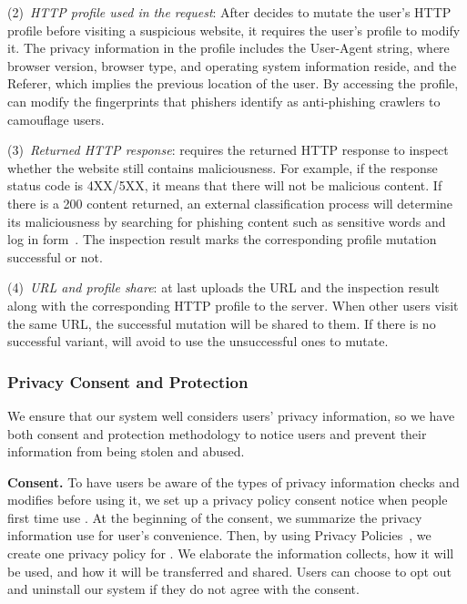 (2)~\emph{HTTP profile used in the request}:
After \spartacus decides to mutate the user's HTTP profile before visiting a suspicious website, it requires the user's profile to modify it.
The privacy information in the profile includes the User-Agent string, where browser version, browser type, and operating system information reside, and the Referer, which implies the previous location of the user.
By accessing the profile, \spartacus can modify the fingerprints that phishers identify as anti-phishing crawlers to camouflage users.

(3)~\emph{Returned HTTP response}:
\spartacus requires the returned HTTP response to inspect whether the website still contains maliciousness.
For example, if the response status code is 4XX/5XX, it means that there will not be malicious content.
If there is a 200 content returned,
an external classification process will determine its maliciousness by searching for phishing content such as sensitive words and log in form~\cite{xiang2011cantina+}.
The inspection result marks the corresponding profile mutation successful or not.

(4)~\emph{URL and profile share}:
\spartacus at last uploads the URL and the inspection result along with the corresponding HTTP profile to the server.
When other users visit the same URL, the successful mutation will be shared to them.
If there is no successful variant, \spartacus will avoid to use the unsuccessful ones to mutate.


\subsubsection{Privacy Consent and Protection}

We ensure that our \spartacus system well considers users' privacy information,
so we have both consent and protection methodology to notice users and prevent their information from being stolen and abused.

\noindent
\textbf{Consent.}
To have users be aware of the types of privacy information \spartacus checks and modifies before using it,
we set up a privacy policy consent notice when people first time use \spartacus.
At the beginning of the consent, we summarize the privacy information \spartacus use for user's convenience.
Then, by using Privacy Policies~\cite{privacypolicy}, we create one privacy policy for \spartacus.
We elaborate the information \spartacus collects, how it will be used, and how it will be transferred and shared.
Users can choose to opt out and uninstall our system if they do not agree with the consent.

